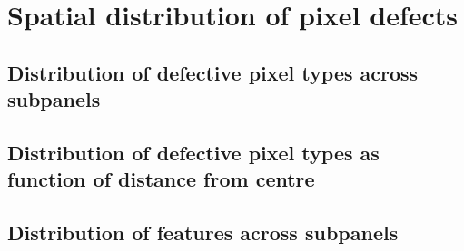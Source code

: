 \documentclass[10pt,fleqn]{article}
\begin{document}


\section{Spatial distribution of pixel defects}

\subsection{Distribution of defective pixel types across subpanels}

\subsection{Distribution of defective pixel types as function of distance from centre}

\subsection{Distribution of features across subpanels}
\end{document}
